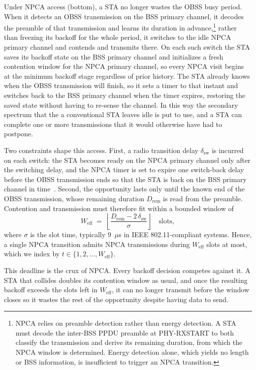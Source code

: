 \documentclass[a4paper,fleqn]{cas-dc}
\begin{document}
Under NPCA access (bottom), a STA no longer wastes the OBSS busy period. When it detects an OBSS transmission on the BSS primary channel, it decodes the preamble of that transmission and learns its duration in advance,\footnote{NPCA relies on preamble detection rather than energy detection. A STA must decode the inter-BSS PPDU preamble at PHY-RXSTART to both classify the transmission and derive its remaining duration, from which the NPCA window is determined. Energy detection alone, which yields no length or BSS information, is insufficient to trigger an NPCA transition.} rather than freezing its backoff for the whole period, it switches to the idle NPCA primary channel and contends and transmits there. On each such switch the STA saves its backoff state on the BSS primary channel and initializes a fresh contention window for the NPCA primary channel, so every NPCA visit begins at the minimum backoff stage regardless of prior history. The STA already knows when the OBSS transmission will finish, so it sets a timer to that instant and switches back to the BSS primary channel when the timer expires, restoring the saved state without having to re-sense the channel. In this way the secondary spectrum that the a conventional STA leaves idle is put to use, and a STA can complete one or more transmissions that it would otherwise have had to postpone.

Two constraints shape this access. First, a radio transition delay $\delta_\mathrm{sw}$ is incurred on each switch: the STA becomes ready on the NPCA primary channel only after the switching delay, and the NPCA timer is set to expire one switch-back delay before the OBSS transmission ends so that the STA is back on the BSS primary channel in time~\citep{ieee80211bn}. Second, the opportunity lasts only until the known end of the OBSS transmission, whose remaining duration $D_\mathrm{rem}$ is read from the preamble. Contention and transmission must therefore fit within a bounded window of
\begin{equation}
    W_\mathrm{eff} \;=\; \left\lfloor
    \frac{D_\mathrm{rem}-2\,\delta_\mathrm{sw}}{\sigma} \right\rfloor
    \quad\text{slots},
    \label{eq:weff}
\end{equation}
where $\sigma$ is the slot time, typically $9$~$\mu$s in IEEE 802.11-compliant systems. Hence, a single NPCA transition admits NPCA transmissions during $W_\mathrm{eff}$ slots at most, which we index by $t \in \{1, 2, \dots, W_\mathrm{eff}\}$. 

This deadline is the crux of NPCA. Every backoff decision competes against it. A STA that collides doubles its contention window as usual, and once the resulting backoff exceeds the slots left in $W_\mathrm{eff}$, it can no longer transmit before the window closes so it wastes the rest of the opportunity despite having data to send.
\end{document}
